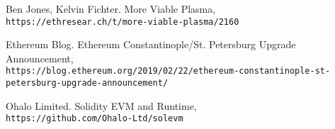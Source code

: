 \documentclass[letterpaper, 11pt]{article}
\begin{document}
\begin{thebibliography}{9}
 \label{ref:morevp}
Ben Jones, Kelvin Fichter. More Viable Plasma,
\\\texttt{https://ethresear.ch/t/more-viable-plasma/2160}

 \label{ref:constantinople}
Ethereum Blog. Ethereum Constantinople/St. Petersburg Upgrade Announcement,
\\\texttt{https://blog.ethereum.org/2019/02/22/ethereum-constantinople-st-petersburg-upgrade-announcement/}

 \label{ref:solevm}
Ohalo Limited. Solidity EVM and Runtime,
\\\texttt{https://github.com/Ohalo-Ltd/solevm}

\end{thebibliography}
\end{document}
